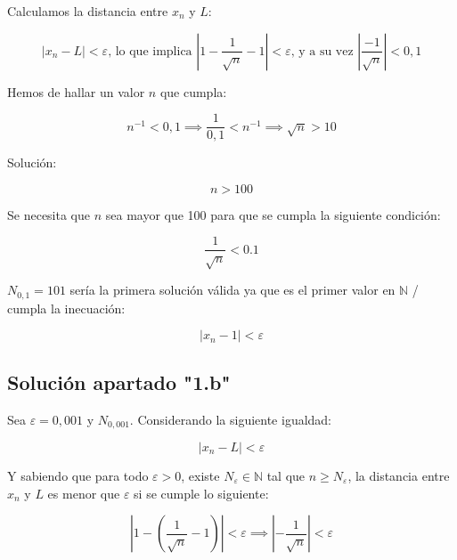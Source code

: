 \documentclass{article}
\begin{document}
Calculamos la distancia entre $x_{n}$ y $L$:

\begin{equation}
\left| x_{n} - L \right| < \varepsilon \text{, lo que implica } \left| 1 - \frac{1}{\sqrt{n}} - 1 \right| < \varepsilon \text{, y a su vez } \left| \frac{-1}{\sqrt{n}} \right| < 0,1
\end{equation}

Hemos de hallar un valor $n$ que cumpla:

\begin{equation}
n^{-1} < 0,1 \implies \frac{1}{0,1} < n^{-1} \implies \sqrt{n} > 10
\end{equation}

Solución:

\begin{equation}
n > 100
\end{equation}

Se necesita que $n$ sea mayor que 100 para que se cumpla la siguiente condición:

\begin{equation}
\frac{1}{\sqrt{n}} < 0.1
\end{equation}

$N_{0,1} = 101$ sería la primera solución válida ya que es el primer valor en $\mathbb{N}$ / cumpla la inecuación:

\begin{equation}
\mid x_{n} - 1 \mid < \varepsilon
\end{equation}

    \subsection{Solución apartado "1.b"}
Sea $\varepsilon = 0,001$ y $N_{0,001}$. Considerando la siguiente igualdad:

\begin{equation}
\left| x_{n} - L \right| < \varepsilon
\end{equation}

Y sabiendo que para todo $\varepsilon > 0$, existe $N_{\varepsilon} \in \mathbb{N}$ tal que $n \geq N_{\varepsilon}$, la distancia entre $x_{n}$ y $L$ es menor que $\varepsilon$ si se cumple lo siguiente:

\begin{equation}
\left| 1- \left(\frac{1}{\sqrt{n}} - 1\right) \right| < \varepsilon \implies \left| -\frac{1}{\sqrt{n}} \right| < \varepsilon
\end{equation}
\end{document}
